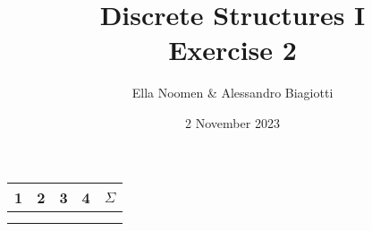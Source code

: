 \documentclass{article}
\title{Discrete Structures I \\ Exercise 2}
\author{Ella Noomen \& Alessandro Biagiotti}
\date{2 November 2023}
\begin{document}
\maketitle
\begin{center}
    \begin{tabular}{|c|c|c|c|c|}
        \hline
        1 & 2 & 3 & 4 & $\Sigma$ \\
        \hline
        & & & & \\
        & & & & \\
        \hline
    \end{tabular}
\end{center}
%
%
%
%




\end{document}
